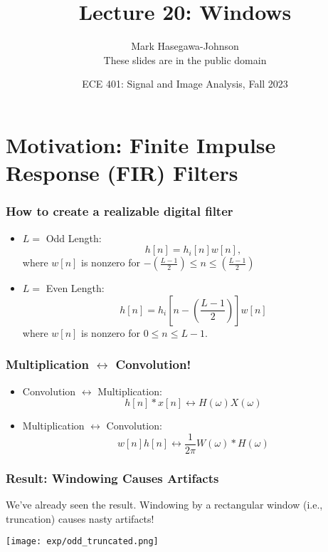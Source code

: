 \documentclass{beamer}
\title{Lecture 20: Windows}
\author{Mark Hasegawa-Johnson\\These slides are in the public domain}
\date{ECE 401: Signal and Image Analysis, Fall 2023}
\begin{document}
\begin{frame}
  \maketitle
\end{frame}

\begin{frame}
  \tableofcontents
\end{frame}

\section[Motivation]{Motivation: Finite Impulse Response (FIR) Filters}
\setcounter{subsection}{1}

\begin{frame}
  \frametitle{How to create a realizable digital filter}
  \begin{itemize}
  \item $L=$ Odd Length:
    \[
    h[n] = h_{i}[n]w[n],
    \]
    where $w[n]$ is nonzero for $-\left(\frac{L-1}{2}\right)\le n\le
    \left(\frac{L-1}{2}\right)$
  \item $L=$ Even Length:
    \[
    h[n] = h_{i}\left[n-\left(\frac{L-1}{2}\right)\right]w[n]
    \]
    where $w[n]$ is nonzero for $0\le n\le L-1$.
  \end{itemize}
\end{frame}

\begin{frame}
  \frametitle{Multiplication $\leftrightarrow$ Convolution!}

  \begin{itemize}
  \item Convolution $\leftrightarrow$ Multiplication:
    \begin{displaymath}
      h[n] \ast x[n] \leftrightarrow H(\omega)X(\omega)
    \end{displaymath}
  \item Multiplication $\leftrightarrow$ Convolution:
    \begin{displaymath}
      w[n]h[n] \leftrightarrow \frac{1}{2\pi}W(\omega)\ast H(\omega)
    \end{displaymath}
  \end{itemize}
\end{frame}

\begin{frame}
  \frametitle{Result: Windowing Causes Artifacts}

  We've already seen the result.  Windowing by a rectangular window
  (i.e., truncation) causes nasty artifacts!

  \centerline{\texttt{[image: exp/odd\_truncated.png]}}
\end{frame}
\end{document}
